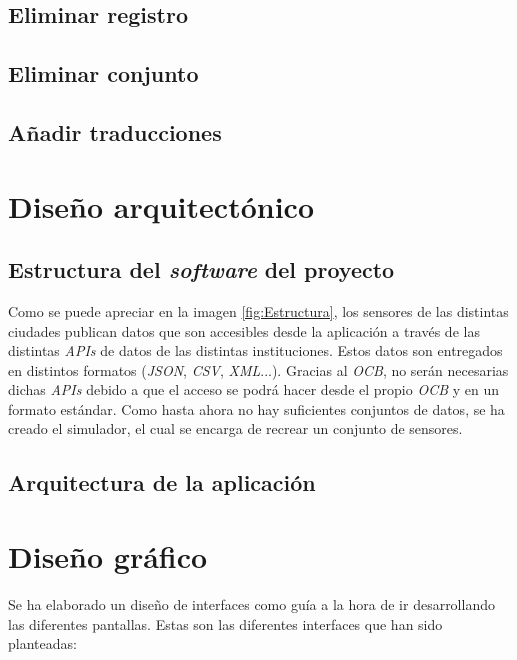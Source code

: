 \subsection{Eliminar registro}
\clearpage
\subsection{Eliminar conjunto}
\clearpage
\subsection{Añadir traducciones}
\clearpage

\section{Diseño arquitectónico}

\subsection{Estructura del \textit{software} del proyecto}
Como se puede apreciar en la imagen \ref{fig:Estructura}, los sensores de las distintas ciudades publican datos que son accesibles desde la aplicación a través de las distintas \textit{APIs} de datos de las distintas instituciones. Estos datos son entregados en distintos formatos (\textit{JSON}, \textit{CSV}, \textit{XML}...).
Gracias al \textit{OCB}, no serán necesarias dichas \textit{APIs} debido a que el acceso se podrá hacer desde el propio \textit{OCB} y en un formato estándar. Como hasta ahora no hay suficientes conjuntos de datos, se ha creado el simulador, el cual se encarga de recrear un conjunto de sensores.
\clearpage
\subsection{Arquitectura de la aplicación}

\section{Diseño gráfico}

Se ha elaborado un diseño de interfaces como guía a la hora de ir desarrollando las diferentes pantallas. Estas son las diferentes interfaces que han sido planteadas:
\clearpage
